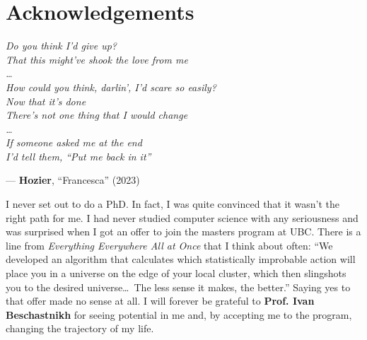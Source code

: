 \chapter{Acknowledgements}

\begin{flushright}
\textit{Do you think I'd give up?\\
That this might've shook the love from me\\
\dots\\
How could you think, darlin', I'd scare so easily?\\
Now that it's done\\
There's not one thing that I would change\\
\dots\\
If someone asked me at the end\\
I'd tell them, ``Put me back in it''}

\vspace{0.5em}
--- \textbf{Hozier}, ``Francesca'' (2023)
\end{flushright}

I never set out to do a PhD.
In fact, I was quite convinced that it wasn't the right path for me.
I had never studied computer science with any seriousness and was surprised when I got an offer to join the masters program at UBC.
There is a line from \textit{Everything Everywhere All at Once} that I think about often: ``We developed an algorithm that calculates which statistically improbable action will place you in a universe on the edge of your local cluster, which then slingshots you to the desired universe\dots\ The less sense it makes, the better.''
Saying yes to that offer made no sense at all.
I will forever be grateful to \textbf{Prof. Ivan Beschastnikh} for seeing potential in me and, by accepting me to the program, changing the trajectory of my life.

